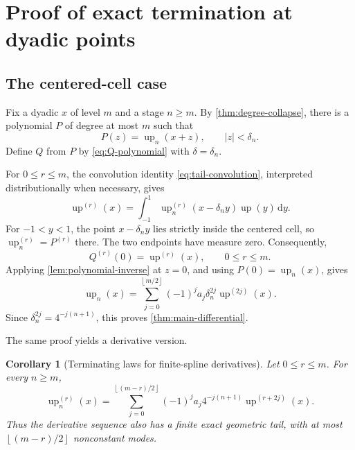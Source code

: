 \documentclass[11pt,oneside]{article}
\newtheorem{corollary}[theorem]{Corollary}
\theoremstyle{definition}
\theoremstyle{remark}
\newcommand{\up}{\operatorname{up}}
\newcommand{\dd}{\,\mathrm d}
\newcommand{\abs}[1]{\left\lvert#1\right\rvert}
\newcommand{\floor}[1]{\left\lfloor#1\right\rfloor}
\begin{document}
\section{Proof of exact termination at dyadic points}

\subsection{The centered-cell case}

Fix a dyadic \(x\) of level \(m\) and a stage \(n\ge m\).  By
\cref{thm:degree-collapse}, there is a polynomial \(P\) of degree at most
\(m\) such that
\begin{equation}\label{eq:P-local}
 P(z)=\up_n(x+z),\qquad \abs z<\delta_n.
\end{equation}
Define \(Q\) from \(P\) by \eqref{eq:Q-polynomial} with
\(\delta=\delta_n\).

For \(0\le r\le m\), the convolution identity
\eqref{eq:tail-convolution}, interpreted distributionally when necessary,
gives
\begin{equation}\label{eq:derivative-convolution}
 \up^{(r)}(x)=
 \int_{-1}^{1}\up_n^{(r)}(x-\delta_ny)\up(y)\dd y.
\end{equation}
For \(-1<y<1\), the point \(x-\delta_ny\) lies strictly inside the centered
cell, so \(\up_n^{(r)}=P^{(r)}\) there.  The two endpoints have measure zero.
Consequently,
\begin{equation}\label{eq:Q-jet}
 Q^{(r)}(0)=\up^{(r)}(x),\qquad 0\le r\le m.
\end{equation}
Applying \cref{lem:polynomial-inverse} at \(z=0\), and using
\(P(0)=\up_n(x)\), gives
\[
 \up_n(x)=\sum_{j=0}^{\floor{m/2}}
 (-1)^ja_j\delta_n^{2j}\up^{(2j)}(x).
\]
Since \(\delta_n^{2j}=4^{-j(n+1)}\), this proves
\cref{thm:main-differential}.

The same proof yields a derivative version.

\begin{corollary}[Terminating laws for finite-spline derivatives]\label{cor:derivative-tail}
Let \(0\le r\le m\).  For every \(n\ge m\),
\begin{equation}\label{eq:derivative-tail}
 \boxed{\displaystyle
 \up_n^{(r)}(x)=
 \sum_{j=0}^{\floor{(m-r)/2}}(-1)^ja_j
 4^{-j(n+1)}\up^{(r+2j)}(x).}
\end{equation}
Thus the derivative sequence also has a finite exact geometric tail, with at
most \(\floor{(m-r)/2}\) nonconstant modes.
\end{corollary}
\end{document}
